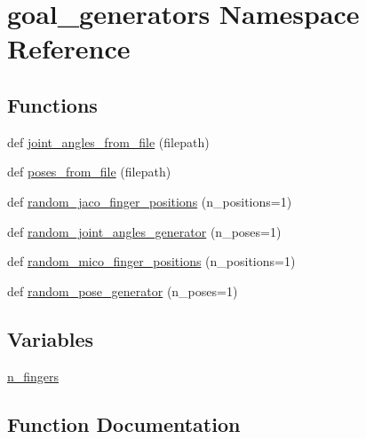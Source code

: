 \hypertarget{namespacegoal__generators}{}\section{goal\+\_\+generators Namespace Reference}
\label{namespacegoal__generators}
\subsection*{Functions}
\begin{DoxyCompactItemize}
\item 
def \hyperlink{namespacegoal__generators_a39b5582c84cdf5891bf92b77ab9c0b3b}{joint\+\_\+angles\+\_\+from\+\_\+file} (filepath)
\item 
def \hyperlink{namespacegoal__generators_a565aa27b68e73f1f3b2d1a9da1332051}{poses\+\_\+from\+\_\+file} (filepath)
\item 
def \hyperlink{namespacegoal__generators_a2b395bfee98a60349c6a7193e8d3059f}{random\+\_\+jaco\+\_\+finger\+\_\+positions} (n\+\_\+positions=1)
\item 
def \hyperlink{namespacegoal__generators_a6ab109de507bd107dedc7801ca7c5381}{random\+\_\+joint\+\_\+angles\+\_\+generator} (n\+\_\+poses=1)
\item 
def \hyperlink{namespacegoal__generators_a092d3fe84232b5b0ead199e6d5a822eb}{random\+\_\+mico\+\_\+finger\+\_\+positions} (n\+\_\+positions=1)
\item 
def \hyperlink{namespacegoal__generators_acc20fd60c84b4f30491d22bf16139668}{random\+\_\+pose\+\_\+generator} (n\+\_\+poses=1)
\end{DoxyCompactItemize}
\subsection*{Variables}
\begin{DoxyCompactItemize}
\item 
\hyperlink{namespacegoal__generators_a8ffcfd842ed393511c7ee860baa70446}{n\+\_\+fingers}
\end{DoxyCompactItemize}


\subsection{Function Documentation}
